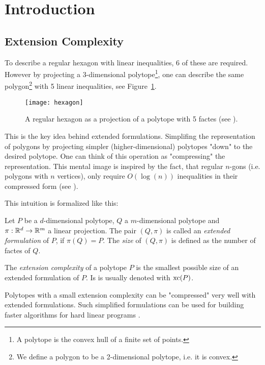 \section{Introduction} 

\subsection{Extension Complexity}

To describe a regular hexagon with linear inequalities, 6 of these are required. However by projecting a 3-dimensional polytope\footnote{A polytope is the convex hull of a finite set of points.}, one can describe the same polygon\footnote{We define a polygon to be a 2-dimensional polytope, i.e. it is convex.} with 5 linear inequalities, see Figure~\ref{fig:hexagon}. 

\begin{figure}[h]
  \centering
  \texttt{[image: hexagon]}
  \caption{A regular hexagon as a projection of a polytope with 5 factes (see \cite{kwan2020extension}).}
  \label{fig:hexagon}
\end{figure}

This is the key idea behind extended formulations. Simplifing the representation of polygons by projecting simpler (higher-dimensional) polytopes "down" to the desired polytope.
One can think of this operation as "compressing" the representation. This mental image is inspired by the fact, that regular $n$-gons (i.e. polygons with $n$ vertices), only require $O(\log(n))$ inequalities in their compressed form (see \cite{kaibel2010constructing}).

This intuition is formalized like this:

\begin{definition}
  Let $P$ be a $d$-dimensional polytope, $Q$ a $m$-dimensional polytope and $\pi:\mathbb{R}^d \to \mathbb{R}^m$ a linear projection.
  The pair $(Q,\pi)$ is called an \emph{extended formulation} of $P$, if $\pi(Q)=P$. The \emph{size} of $(Q,\pi)$ is defined as the number of factes of $Q$.
\end{definition}

\begin{definition}
  The \emph{extension complexity} of a polytope $P$ is the smallest possible size of an extended formulation of $P$. Is is usually denoted with $\operatorname{xc}(P)$.
\end{definition}

Polytopes with a small extension complexity can be "compressed" very well with extended formulations.
Such simplified formulations can be used for building faster algorithms for hard linear programs \cite{yannakakis1991expressing}.



